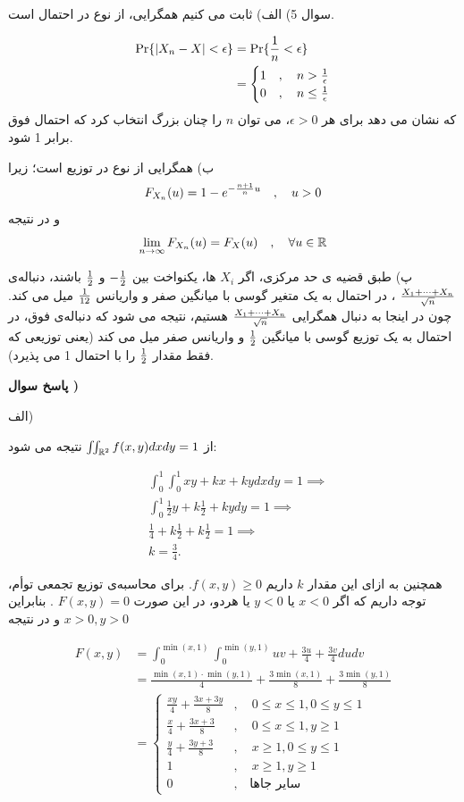 \documentclass[10pt,letterpaper]{report}
\newcounter{questionanswernumber}
\newcommand{\QA}{
\textbf{پاسخ سوال \thequestionanswernumber)}
\stepcounter{questionanswernumber}
}
\newcommand{\eqn}[1]{
\[\begin{split}
#1
\end{split}\]
}
\begin{document}
سوال 5) الف) ثابت می کنیم همگرایی، از نوع در احتمال است.
\eqn{
\Pr\{|X_n-X|<\epsilon\}&=\Pr\{{1\over n}<\epsilon\}
\\&=\begin{cases}
1&,\quad n>{1\over \epsilon}\\
0&,\quad n\le {1\over \epsilon}
\end{cases}
}{}
که نشان می دهد برای هر $\epsilon>0$، می توان $n$ را چنان بزرگ انتخاب کرد که احتمال فوق برابر 1 شود.

ب) همگرایی از نوع در توزیع است؛ زیرا
$$
F_{X_n}(u)=1-e^{-{n+1\over n}u}\quad,\quad u>0
$$
و در نتیجه
$$
\lim_{n\to \infty}F_{X_n}(u)=F_X(u)\quad,\quad \forall u\in \Bbb R
$$

پ) طبق قضیه ی حد مرکزی، اگر $X_i$ ها، یکنواخت بین $-{1\over 2}$ و $1\over 2$ باشند، دنباله‌ی 
$
X_1+\cdots+X_n\over \sqrt n
$
، در احتمال به یک متغیر گوسی با میانگین صفر و واریانس $1\over 12$ میل می کند. چون در اینجا به دنبال همگرایی 
$
X_1+\cdots+X_n\over \sqrt n
$
هستیم، نتیجه می شود که دنباله‌ی فوق، در احتمال به یک توزیع گوسی با میانگین $1\over 2$ و واریانس صفر میل می کند (یعنی توزیعی که فقط مقدار $1\over 2$ را با احتمال 1 می پذیرد).

\QA

الف)

از 
$
\iint_{\Bbb R^2}f(x,y)dxdy=1
$
نتیجه می شود:
\eqn{
&\int_0^1\int_0^1xy+kx+kydxdy=1\implies
\\&\int_0^1\frac{1}{2}y+k\frac{1}{2}+kydy=1\implies
\\&\frac{1}{4}+k\frac{1}{2}+k\frac{1}{2}=1\implies
\\&k=\frac{3}{4}.
}
همچنین به ازای این مقدار $k$ داریم
$
f(x,y)\ge 0
$.
برای محاسبه‌ی توزیع تجمعی توأم، توجه داریم که اگر 
$
x<0
$
یا 
$
y<0
$
یا هردو، در این صورت
$
F(x,y)=0
$
.
بنابراین 
$
x>0,y>0
$
و در نتیجه
\eqn{
F(x,y)&=
\int_0^{\min(x,1)}\int_0^{\min(y,1)} uv+\frac{3u}{4}+\frac{3v}{4}dudv
\\&=
\frac{\min(x,1)\cdot \min(y,1)}{4}+\frac{3\min(x,1)}{8}+\frac{3\min(y,1)}{8}
\\&=
\begin{cases}
\frac{xy}{4}+\frac{3x+3y}{8}&,\quad 0\le x\le 1,0\le y\le 1\\
\frac{x}{4}+\frac{3x+3}{8}&,\quad 0\le x\le 1,y\ge 1\\
\frac{y}{4}+\frac{3y+3}{8}&,\quad x\ge 1,0\le y\le 1\\
1&,\quad x\ge 1,y\ge 1\\
0&,\quad \text{سایر جاها}
\end{cases}
}
\end{document}
